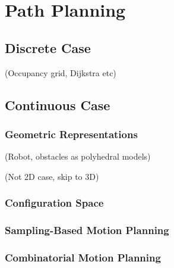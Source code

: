 \section{Path Planning}

	\subsection{Discrete Case}

		(Occupancy grid, Dijkstra etc)

	\subsection{Continuous Case}

		\subsubsection{Geometric Representations}

			(Robot, obstacles as polyhedral models)

			(Not 2D case, skip to 3D)

		\subsubsection{Configuration Space}

		\subsubsection{Sampling-Based Motion Planning}

		\subsubsection{Combinatorial Motion Planning}

